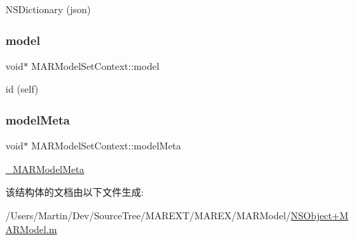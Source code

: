 N\+S\+Dictionary (json) 

\mbox{\label{struct_m_a_r_model_set_context_ad8bc265a61c53ca700445533c770861c}} 
\subsubsection{\texorpdfstring{model}{model}}
{\footnotesize\ttfamily void$\ast$ M\+A\+R\+Model\+Set\+Context\+::model}



id (self) 

\mbox{\label{struct_m_a_r_model_set_context_ad6f5277db320b44302b1432474a20cc4}} 
\subsubsection{\texorpdfstring{model\+Meta}{modelMeta}}
{\footnotesize\ttfamily void$\ast$ M\+A\+R\+Model\+Set\+Context\+::model\+Meta}



\hyperlink{interface___m_a_r_model_meta}{\+\_\+\+M\+A\+R\+Model\+Meta} 



该结构体的文档由以下文件生成\+:\begin{DoxyCompactItemize}
\item 
/\+Users/\+Martin/\+Dev/\+Source\+Tree/\+M\+A\+R\+E\+X\+T/\+M\+A\+R\+E\+X/\+M\+A\+R\+Model/\hyperlink{_n_s_object_09_m_a_r_model_8m}{N\+S\+Object+\+M\+A\+R\+Model.\+m}\end{DoxyCompactItemize}

